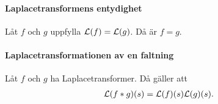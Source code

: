 \proof

\paragraph{Laplacetransformens entydighet}
Låt $f$ och $g$ uppfylla $\mathcal{L}(f) = \mathcal{L}(g)$. Då är $f = g$.

\proof

\paragraph{Laplacetransformationen av en faltning}
Låt $f$ och $g$ ha Laplacetransformer. Då gäller att
\begin{align*}
	\mathcal{L}(f * g)(s) = \mathcal{L}(f)(s)\mathcal{L}(g)(s).
\end{align*}

\proof